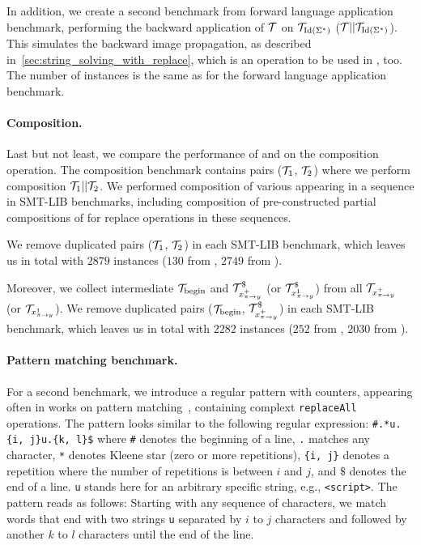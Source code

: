 In addition, we create a second benchmark from forward language application benchmark, performing the backward application of $\mathcal{T}$ on $\mathcal{T}_{\text{Id}(\Sigma^*)}$ ($ \mathcal{T} || \mathcal{T}_{\text{Id}(\Sigma^*)}$).
This simulates the backward image propagation, as described in~\ref{sec:string_solving_with_replace}, which is an operation to be used in \noodler, too.
The number of instances is the same as for the forward language application benchmark.

\paragraph{Composition.}
Last but not least, we compare the performance of \mata and \mona on the composition operation.
The composition benchmark contains pairs ($\mathcal{T}_1$, $\mathcal{T}_2$) where we perform composition $\mathcal{T}_1 || \mathcal{T}_2$.
We performed composition of various \nfts appearing in a sequence in SMT-LIB benchmarks, including composition of pre-constructed partial compositions of \nfts for replace operations in these sequences.

We remove duplicated pairs ($\mathcal{T}_1$, $\mathcal{T}_2$) in each SMT-LIB benchmark, which leaves us in total with $2879$ instances ($130$ from \webapp, $2749$ from \transducerPlus).

Moreover, we collect intermediate \nfts $\mathcal{T}_{\text{begin}}$ and $\mathcal{T}^\$_{x^{+}_{\pi \rightarrow y}}$ (or $\mathcal{T}^\$_{x^{1}_{\pi \rightarrow y}}$) from all $\mathcal{T}_{x^{+}_{\pi \rightarrow y}}$ (or $\mathcal{T}_{x^{1}_{\pi \rightarrow y}}$).
We remove duplicated pairs ($\mathcal{T}_{\text{begin}}$, $\mathcal{T}^\$_{x^{+}_{\pi \rightarrow y}}$) in each SMT-LIB benchmark, which leaves us in total with $2282$ instances ($252$ from \webapp, $2030$ from \transducerPlus).

\paragraph{Pattern matching benchmark.}

For a second benchmark, we introduce a regular pattern with counters, appearing often in works on pattern matching~\cite{10.1007/978-3-031-30829-1_19}, containing complext \texttt{replaceAll} operations.
The pattern looks similar to the following regular expression:
\texttt{\#.*u.\{i, j\}u.\{k, l\}\$} where
\texttt{\#} denotes the beginning of a line, \texttt{.} matches any character, \texttt{*} denotes Kleene star (zero or more repetitions), \texttt{\{i, j\}} denotes a repetition where the number of repetitions is between $i$ and $j$, and $\$$ denotes the end of a line. \texttt{u} stands here for an arbitrary specific string, e.g., \texttt{<script>}.
The pattern reads as follows: Starting with any sequence of characters, we match words that end with two strings \texttt{u} separated by $i$ to $j$ characters and followed by another $k$ to $l$ characters until the end of the line.


